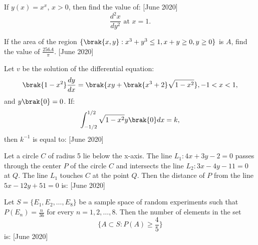     \item If $ y(x) = x^x $, $ x > 0 $, then find the value of: \hfill{[June 2020]}
    \[
    \frac{d^2x}{dy^2} \text{ at } x = 1.
    \]

    \item If the area of the region $ \{ \brak{x, y}: x^3 + y^3 \leq 1, x + y \geq 0, y \geq 0 \} $ is $ A $, find the value of $ \frac{256A}{\pi} $. \hfill{[June 2020]}

    \item Let $ v $ be the solution of the differential equation: 
    \[
    \brak{1 - x^2} \frac{dy}{dx} = \brak{xy + \brak{x^3 + 2}\sqrt{1 - x^2}}, -1 < x < 1,
    \]
    and $ y\brak{0} = 0 $. If:
    \[
    \int_{-1/2}^{1/2} \sqrt{1 - x^2} y\brak{0} dx = k,
    \]
    then $ k^{-1} $ is equal to: \hfill{[June 2020]}

    \item Let a circle $ C $ of radius 5 lie below the x-axis. The line $ L_1: 4x + 3y - 2 = 0 $ passes through the center $ P $ of the circle $ C $ and intersects the line $ L_2: 3x - 4y - 11 = 0 $ at $ Q $. The line $ L_1 $ touches $ C $ at the point $ Q $. Then the distance of $ P $ from the line $ 5x - 12y + 51 = 0 $ is:  \hfill{[June 2020]}
    
    \item Let $ S = \{ E_1, E_2, \dots, E_8 \} $ be a sample space of random experiments such that $ P(E_n) = \frac{n}{36} $ for every $ n = 1, 2, \dots, 8 $. Then the number of elements in the set 
    \[
    \{ A \subset S : P(A) \geq \frac{4}{5} \}
    \]
    is:  \hfill{[June 2020]}

